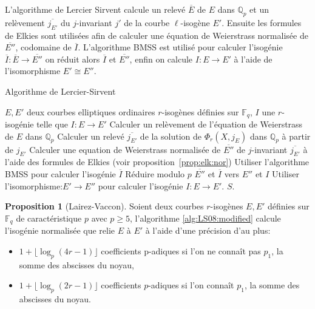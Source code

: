 \documentclass[10pt,a4paper]{book}
\theoremstyle{plain}
\theoremstyle{definition}
\theoremstyle{definition}
\theoremstyle{definition}
\newtheorem{prop}[thm]{Proposition}
\theoremstyle{definition}
\theoremstyle{remark}
\theoremstyle{remark}
\theoremstyle{definition}
\begin{document}
L'algorithme de Lercier Sirvent calcule un relevé $\overline{E}$ de $E$ dans 
$\mathbb{Q}_p$ et un relèvement $\overline{j_{E'}}$ du $j$-invariant $j'$ de la
courbe $\ell$-isogène $E'$. Ensuite les formules de Elkies \cite{elkies1998} sont utilisées afin  de calculer une équation de Weierstrass normalisée de $\overline{E''}$, codomaine de $\overline{I}$. L'algorithme BMSS \cite{BMSS08} est utilisé pour calculer l'isogénie $\overline{I}:\overline{E} \rightarrow \overline{E''}$ on réduit alors $\overline{I}$ et $\overline{E''}$, enfin on calcule $I: E \rightarrow E' $ à l'aide de l'isomorphisme $E' \cong E''$. 

\begin{algorithm}
\caption{\label{alg:LS08:modified} Algorithme de Lercier-Sirvent}
\begin{algorithmic}[1]
\REQUIRE $E,E'$ deux courbes elliptiques ordinaires $r$-isogènes définies sur $\mathbb{F}_q$,%
\ENSURE $I$ une $r$-isogénie telle que $I:E \rightarrow E'$
\STATE Calculer un relèvement de l'équation de Weierstrass de $E$ dans $\mathbb{Q}_p$
\STATE \label{alg:LS08:modified:rel:polmod} Calculer un relevé $\overline{j_{E'}}$ de la solution de $\Phi_{r}(X,j_E)$ dans $\mathbb{Q}_p$ à partir de $j_{E'}$
\STATE Calculer une equation de Weierstrass normalisée de $\overline{E''}$ de $j$-invariant $\overline{j_{E'}}$ à l'aide des formules de Elkies (voir proposition~\ref{prop:elk:nor})
\STATE Utiliser l'algorithme BMSS pour calculer l'isogénie $\overline{I}$
\STATE Réduire modulo $p$ $\overline{E''}$ et $\overline{I}$ vers $E''$ et $I$
\STATE Utiliser l'isomorphisme:$E' \rightarrow E''$ pour calculer l'isogénie $I: E \rightarrow E'$.
\RETURN$S$. 
\end{algorithmic}
\end{algorithm}

\begin{prop}[Lairez-Vaccon]
Soient deux courbes $r$-isogènes $E,E'$ définies sur $\mathbb{F}_q$ de caractéristique $p$ avec $p \geqslant 5$, l'algorithme \ref{alg:LS08:modified} calcule l'isogénie normalisée que relie $E$ à $E'$ à l'aide d'une précision d'au plus: 
\begin{itemize}
\item $ 1 + \lfloor \log_p(4 r - 1) \rfloor $ coefficients p-adiques si l'on ne connaît pas $p_1$, la somme des abscisses du noyau,
\item  $ 1 + \lfloor \log_p(2 r - 1) \rfloor $ coefficients $p$-adiques si l'on connaît $p_1$, la somme des abscisses du noyau.
\end{itemize}
\end{prop}
\end{document}
